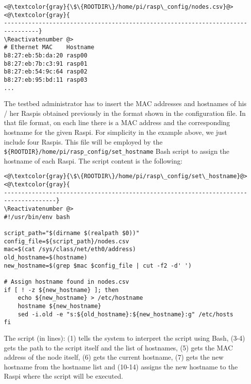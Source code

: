 \Suppressnumber\begin{lstlisting}[]
<@\textcolor{gray}{\$\{ROOTDIR\}/home/pi/rasp\_config/nodes.csv}@>
<@\textcolor{gray}{
--------------------------------------------------------------------------------}
\Reactivatenumber @>
# Ethernet MAC    Hostname
b8:27:eb:5b:da:20 rasp00
b8:27:eb:7b:c3:91 rasp01
b8:27:eb:54:9c:64 rasp02
b8:27:eb:95:bd:11 rasp03
...
\end{lstlisting}
\FloatBarrier
\vspace{-5mm}

The testbed administrator has to insert the \ac{MAC} addresses and hostnames
of his / her \ac{Raspi}s obtained previously in the format shown in the
configuration file. In that file format, on each line there is a \ac{MAC}
address and the corresponding hostname for the given \ac{Raspi}. For
simplicity in the example above, we just include four \ac{Raspi}s.
This file will be employed by the
\texttt{\$\{ROOTDIR\}/home/pi/rasp\_config/set\_hostname}
\ac{Bash} script to assign the hostname of each \ac{Raspi}.
The script content is the following:

\Suppressnumber\begin{lstlisting}[]
<@\textcolor{gray}{\$\{ROOTDIR\}/home/pi/rasp\_config/set\_hostname}@>
<@\textcolor{gray}{
-------------------------------------------------------------------------------------}
\Reactivatenumber @>
#!/usr/bin/env bash

script_path="$(dirname $(realpath $0))"
config_file=${script_path}/nodes.csv
mac=$(cat /sys/class/net/eth0/address)
old_hostname=$(hostname)
new_hostname=$(grep $mac $config_file | cut -f2 -d' ')

# Assign hostname found in nodes.csv
if [ ! -z ${new_hostname} ]; then
    echo ${new_hostname} > /etc/hostname
    hostname ${new_hostname}
    sed -i.old -e "s:${old_hostname}:${new_hostname}:g" /etc/hosts
fi
\end{lstlisting}
\FloatBarrier
\vspace{-5mm}

The script (in lines): (1) tells the system to interpret the script
using \ac{Bash}, (3-4) gets the path to the script itself and the list of
hostnames, (5) gets the \ac{MAC} address of the node itself, (6) gets the
current hostname, (7) gets the new hostname from the hostname list and
(10-14) assigns the new hostname to the \ac{Raspi} where the script
will be executed.

